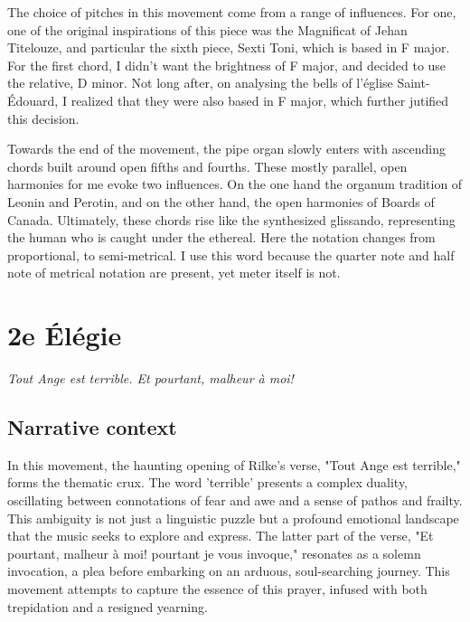 \documentclass[12pt,twoside,maitrise]{dms_ks}
\theoremstyle{definition}
\begin{document}

The choice of pitches in this movement come from a range of influences.
For one, one of the original inspirations of this piece was the Magnificat of Jehan Titelouze, and particular the sixth piece, Sexti Toni, which is based in F major.
For the first chord, I didn't want the brightness of F major, and decided to use the relative, D minor.
Not long after, on analysing the bells of l'église Saint-Édouard, I realized that they were also based in F major, which further jutified this decision.

Towards the end of the movement, the pipe organ slowly enters with ascending chords built around open fifths and fourths.
These mostly parallel, open harmonies for me evoke two influences.
On the one hand the organum tradition of Leonin and Perotin, and on the other hand, the open harmonies of Boards of Canada.
Ultimately, these chords rise like the synthesized glissando, representing the human who is caught under the ethereal.
Here the notation changes from proportional, to semi-metrical.
I use this word because the quarter note and half note of metrical notation are present, yet meter itself is not.


\section{2e Élégie}

\epigraph{\textit{Tout Ange est terrible.
Et pourtant, malheur à moi!}}{}

\subsection{Narrative context}

In this movement, the haunting opening of Rilke's verse, "Tout Ange est terrible," forms the thematic crux.
The word 'terrible' presents a complex duality, oscillating between connotations of fear and awe and a sense of pathos and frailty.
This ambiguity is not just a linguistic puzzle but a profound emotional landscape that the music seeks to explore and express.
The latter part of the verse, "Et pourtant, malheur à moi!
pourtant je vous invoque," resonates as a solemn invocation, a plea before embarking on an arduous, soul-searching journey.
This movement attempts to capture the essence of this prayer, infused with both trepidation and a resigned yearning.
\end{document}
